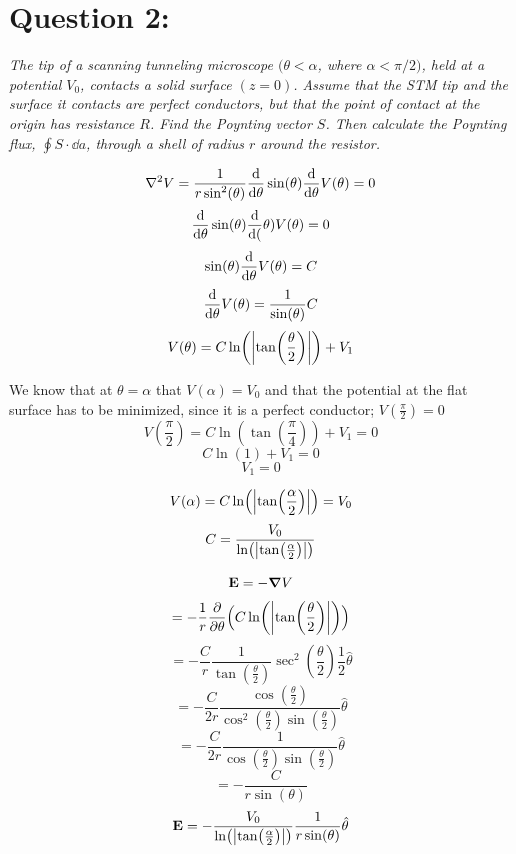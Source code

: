 \documentclass[12pt]{article}
\begin{document}
\section*{Question 2:}
\emph{The tip of a scanning tunneling microscope $(\theta < \alpha$, where $\alpha < \pi/2)$, held at a potential $V_0$, contacts a solid surface $(z=0)$. Assume that the STM tip and the surface it contacts are perfect conductors, but that the point of contact at the origin has resistance $R$. Find the Poynting vector $S$. Then calculate the Poynting flux, $\oint S\cdot \dd{a}$, through a shell of radius $r$ around the resistor.}\bigskip

\[\laplacian{V} = \frac{1}{r \sin^2(\theta)}\dv{\theta}\sin(\theta)\dv{\theta}V(\theta) = 0\]
\[\dv{\theta}\sin(\theta)\dv(\theta)V(\theta) = 0\]
\[\sin(\theta)\dv{\theta}V(\theta) = C\]
\[\dv{\theta}V(\theta) = \frac{1}{\sin(\theta)}C\]
\[V(\theta) = C\ln(\abs{\tan(\frac{\theta}{2})}) + V_1\]

We know that at $\theta = \alpha$ that $V(\alpha) = V_0$ and that the potential at the flat surface has to be minimized, since it is a perfect conductor; $V(\frac{\pi}{2}) = 0$
\[V(\frac{\pi}{2}) = C\ln(\tan(\frac{\pi}{4})) + V_1 = 0\]
\[C\ln(1) + V_1 = 0\]
\[V_1 = 0\]

\[V(\alpha) = C \ln(\abs{\tan(\frac{\alpha}{2})}) = V_0\]
\[C = \frac{V_0}{\ln(\abs{\tan(\frac{\alpha}{2})})}\]


\[\vb{E} = -\grad{V}\]
\[= -\frac{1}{r}\pdv{\theta}\Big(C \ln(\abs{\tan(\frac{\theta}{2})})\Big)\]
\[= -\frac{C}{r} \frac{1}{\tan(\frac{\theta}{2})}\sec^2(\frac{\theta}{2})\frac{1}{2}\hat{\theta}\]
\[=-\frac{C}{2r}\frac{\cos(\frac{\theta}{2})}{\cos^2(\frac{\theta}{2})\sin(\frac{\theta}{2})}\hat{\theta}\]
\[=-\frac{C}{2r}\frac{1}{\cos(\frac{\theta}{2})\sin(\frac{\theta}{2})}\hat{\theta}\]
\[= -\frac{C}{r \sin(\theta)}\]
\[\vb{E}= - \frac{V_0}{\ln(\abs{\tan(\frac{\alpha}{2})})}\frac{1}{r \sin(\theta)}\hat{\theta}\]
\end{document}
